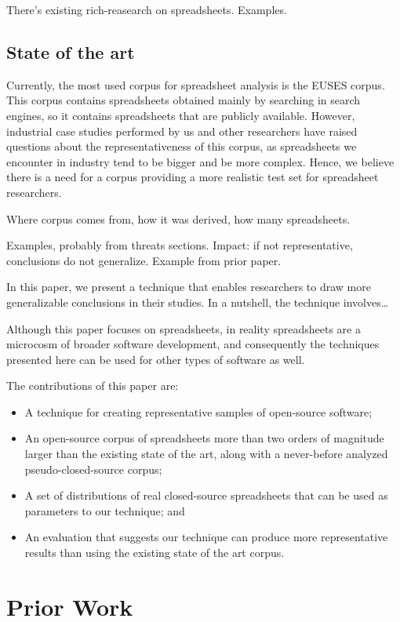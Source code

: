 \documentclass{sig-alternate} %
\begin{document}
There's existing rich-reasearch on spreadsheets.
Examples.

\subsection{State of the art}
Currently, the most used corpus for spreadsheet analysis is the EUSES corpus. This corpus contains spreadsheets obtained mainly by searching in search engines, so it contains spreadsheets that are publicly available. However, industrial case studies performed by us and other researchers have raised questions about the representativeness of this corpus, as spreadsheets we  encounter in industry tend to be bigger and be more complex. Hence, we believe there is a need for a corpus providing a more realistic test set for spreadsheet researchers.

Where corpus comes from, how it was derived, how many spreadsheets.


Examples, probably from threats sections.
Impact: if not representative, conclusions do not generalize.
Example from prior paper.

In this paper, we present a technique that enables researchers
to draw more generalizable conclusions in their studies.
In a nutshell, the technique involves\ldots

Although this paper focuses on spreadsheets, in reality 
spreadsheets are a microcosm of broader software development,
and consequently the techniques presented here can be used for other 
types of software as well.

The contributions of this paper are:

\begin{itemize}
  \item A technique for creating representative samples of open-source
  		software;
  \item An open-source corpus of spreadsheets more than two orders of magnitude larger
 		than the existing state of the art, along with a never-before analyzed
 		pseudo-closed-source corpus;
  \item A set of distributions of real closed-source spreadsheets that can be
  		used as parameters to our technique; and
  \item An evaluation that suggests our technique can produce more representative
  		results than using the existing state of the art corpus.
\end{itemize}

\section{Prior Work}
\end{document}
